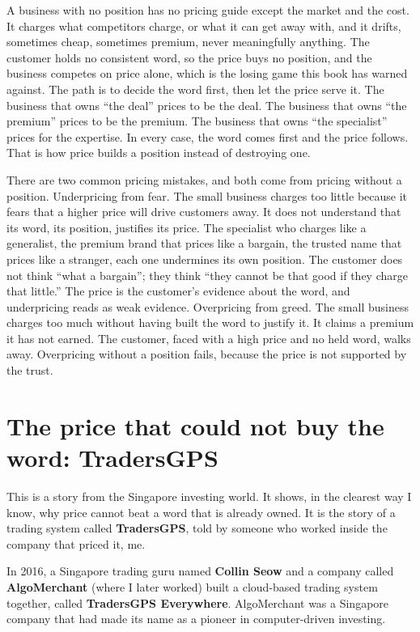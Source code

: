 \documentclass[10pt,twoside,openany]{memoir}
\newcommand{\needspacehead}{\needspace{4\baselineskip}}
\let\oldsection\section
\renewcommand{\section}{\needspacehead\oldsection}
\begin{document}
{A business with no position has no pricing guide except the market and
the cost. It charges what competitors charge, or what it can get away
with, and it drifts, sometimes cheap, sometimes premium, never
meaningfully anything. The customer holds no consistent word, so the
price buys no position, and the business competes on price alone, which
is the losing game this book has warned against. The path is to decide
the word first, then let the price serve it. The business that owns
``the deal'' prices to be the deal. The business that owns ``the
premium'' prices to be the premium. The business that owns ``the
specialist'' prices for the expertise. In every case, the word comes
first and the price follows. That is how price builds a position instead
of destroying one.

There are two common pricing mistakes, and both come from pricing
without a position. Underpricing from fear. The small business charges
too little because it fears that a higher price will drive customers
away. It does not understand that its word, its position, justifies its
price. The specialist who charges like a generalist, the premium brand
that prices like a bargain, the trusted name that prices like a
stranger, each one undermines its own position. The customer does not
think ``what a bargain''; they think ``they cannot be that good if they
charge that little.'' The price is the customer's evidence about the
word, and underpricing reads as weak evidence. Overpricing from greed.
The small business charges too much without having built the word to
justify it. It claims a premium it has not earned. The customer, faced
with a high price and no held word, walks away. Overpricing without a
position fails, because the price is not supported by the trust.

\section{The price that could not buy the word:
TradersGPS}\label{the-price-that-could-not-buy-the-word-tradersgps}

This is a story from the Singapore investing world. It shows, in the
clearest way I know, why price cannot beat a word that is already owned.
It is the story of a trading system called \textbf{TradersGPS}, told by
someone who worked inside the company that priced it, me.

In 2016, a Singapore trading guru named \textbf{Collin Seow} and a
company called \textbf{AlgoMerchant} (where I later worked) built a
cloud-based trading system together, called \textbf{TradersGPS
Everywhere}. AlgoMerchant was a Singapore company that had made its name
as a pioneer in computer-driven investing.

}
\end{document}
